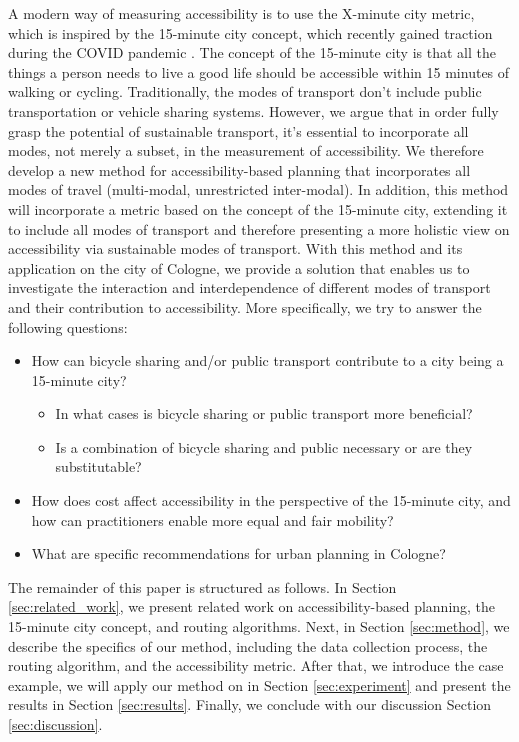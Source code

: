 A modern way of measuring accessibility is to use the X-minute city metric, which is inspired by the 15-minute city concept, which recently gained traction during the COVID pandemic \cite{morenoIntroducing15MinuteCity2021}.
The concept of the 15-minute city is that all the things a person needs to live a good life should be accessible within 15 minutes of walking or cycling.
Traditionally, the modes of transport don't include public transportation or vehicle sharing systems.
However, we argue that in order fully grasp the potential of sustainable transport, it's essential to incorporate all modes, not merely a subset, in the measurement of accessibility.
We therefore develop a new method for accessibility-based planning that incorporates all modes of travel (multi-modal, unrestricted inter-modal).
In addition, this method will incorporate a metric based on the concept of the 15-minute city, extending it to include all modes of transport and therefore presenting a more holistic view on accessibility via sustainable modes of transport.
With this method and its application on the city of Cologne, we provide a solution that enables us to investigate the interaction and interdependence of different modes of transport and their contribution to accessibility. 
More specifically, we try to answer the following questions:
\begin{itemize}
  \item How can bicycle sharing and/or public transport contribute to a city being a 15-minute city?
  \begin{itemize}
    \item In what cases is bicycle sharing or public transport more beneficial?
    \item Is a combination of bicycle sharing and public necessary or are they substitutable?
  \end{itemize}
  \item How does cost affect accessibility in the perspective of the 15-minute city, and how can practitioners enable more equal and fair mobility?
  \item What are specific recommendations for urban planning in Cologne?
\end{itemize}


The remainder of this paper is structured as follows.
In Section \ref{sec:related_work}, we present related work on accessibility-based planning, the 15-minute city concept, and routing algorithms.
Next, in Section \ref{sec:method}, we describe the specifics of our method, including the data collection process, the routing algorithm, and the accessibility metric.
After that, we introduce the case example, we will apply our method on in Section \ref{sec:experiment} and present the results in Section \ref{sec:results}.
Finally, we conclude with our discussion Section \ref{sec:discussion}.

